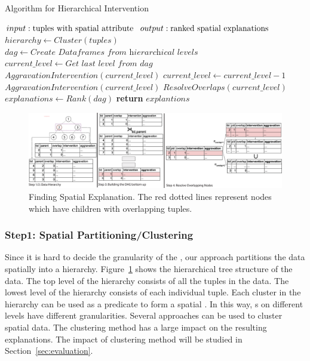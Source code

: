 \begin{algorithm}
\caption{Algorithm for Hierarchical Intervention}\label{alg:hieint}
\begin{algorithmic}[1]
	\State $input: \textnormal{tuples with spatial attribute}$
    \State $output: \textnormal{ranked spatial explanations}$
    \State $hierarchy \gets Cluster(tuples)$
    \State $dag \gets \textit{Create Dataframes from hierarchical levels}$
    \State $current\_level \gets \textit{Get last level from }dag$
    \State $AggravationIntervention(current\_level)$
    \State $current\_level \gets current\_level - 1$
    	\State $AggravationIntervention(current\_level)$
        \State $ResolveOverlaps(current\_level)$
    \EndWhile
    \State $explanations \gets Rank(dag)$
    \State \textbf{return} $explantions$
\EndProcedure
\end{algorithmic}
\end{algorithm}




\begin{figure}[t]
\centerline{\includegraphics[width=\textwidth]{images/steps}}
\caption{Finding Spatial Explanation. The red dotted lines represent nodes which have children with overlapping tuples.}
  \label{fig:steps}
\end{figure}


\subsubsection{Step1: Spatial Partitioning/Clustering}
Since it is hard to decide the granularity of the {\explanation}, our approach partitions the data spatially into a hierarchy. 
Figure~\ref{fig:steps} shows the hierarchical tree structure of the data. 
The top level of the hierarchy consists of all the tuples in the data. 
The lowest level of the hierarchy consists of each individual tuple. 
Each cluster in the hierarchy can be used as a predicate to form a spatial {\explanation}. 
In this way, {\explanation}s on different levels have different granularities. 
Several approaches can be used to cluster spatial data. The clustering method has a large impact on the resulting explanations. The impact of clustering method will be studied in Section~\ref{sec:evaluation}.

